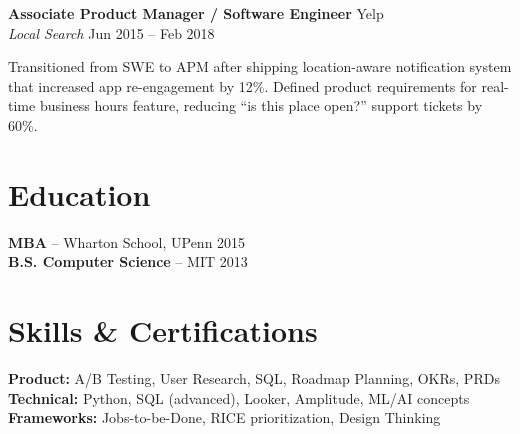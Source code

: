 \documentclass[11pt,letterpaper]{article}
\begin{document}
\vspace{8pt}
{\large\bfseries Associate Product Manager / Software Engineer} \hfill Yelp\\
{\color{accent}\itshape Local Search} \hfill {\small Jun 2015 -- Feb 2018}

\vspace{4pt}
Transitioned from SWE to APM after shipping location-aware notification system that increased app re-engagement by 12\%. Defined product requirements for real-time business hours feature, reducing ``is this place open?'' support tickets by 60\%.

\section{Education}

\textbf{MBA} -- Wharton School, UPenn \hfill 2015\\
\textbf{B.S. Computer Science} -- MIT \hfill 2013 

\section{Skills \& Certifications}

\textbf{Product:} A/B Testing, User Research, SQL, Roadmap Planning, OKRs, PRDs \\
\textbf{Technical:} Python, SQL (advanced), Looker, Amplitude, ML/AI concepts \\
\textbf{Frameworks:} Jobs-to-be-Done, RICE prioritization, Design Thinking
\end{document}
